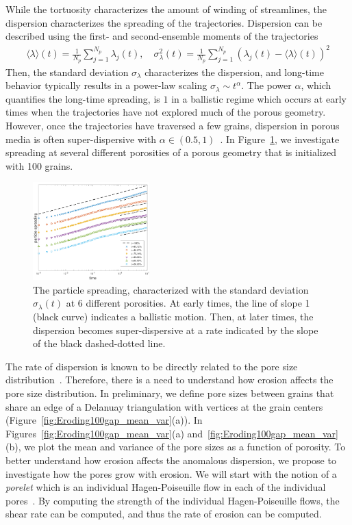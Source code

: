 \documentclass[11pt]{article}
\begin{document}
While the tortuosity characterizes the amount of winding of streamlines, the dispersion characterizes the spreading of the trajectories.  Dispersion can be described using the first- and second-ensemble moments of the trajectories
\begin{align}
  \langle \lambda \rangle (t) = \frac{1}{N_p} \sum_{j=1}^{N_p}
    \lambda_j(t), \quad \sigma_\lambda^{2}(t) = \frac{1}{N_p}
    \sum_{j=1}^{N_p} (\lambda_j(t) - \langle \lambda \rangle(t))^2
\end{align}
Then, the standard deviation $\sigma_\lambda$ characterizes the
dispersion, and long-time behavior typically results in a power-law
scaling $\sigma_\lambda \sim t^{\alpha}$. The power $\alpha$, which
quantifies the long-time spreading, is $1$ in a ballistic regime which
occurs at early times when the trajectories have not explored much of
the porous geometry. However, once the trajectories have traversed a few
grains, dispersion in porous media is often super-dispersive with
$\alpha \in (0.5,1)$~\cite{}. In Figure~\ref{fig:100dispersion}, we
investigate spreading at several different porosities of a porous
geometry that is initialized with 100 grains.
\begin{figure}
  \includegraphics[width=0.4\textwidth]{figs/100b_second_moment_long_ref}
  \caption{\label{fig:100dispersion} The particle spreading,
  characterized with the standard deviation $\sigma_\lambda(t)$ at 6
  different porosities. At early times, the line of slope 1 (black
  curve) indicates a ballistic motion. Then, at later times, the
  dispersion becomes super-dispersive at a rate indicated by the slope
  of the black dashed-dotted line.}
\end{figure}

The rate of dispersion is known to be directly related to the pore size distribution~\cite{dea-qua-bir-jua2018}. Therefore, there is a need to understand how erosion affects the pore size distribution. In preliminary, we define pore sizes between grains that share an edge of a Delanuay triangulation with vertices at the grain centers (Figure~\ref{fig:Eroding100gap_mean_var}(a)). In Figures~\ref{fig:Eroding100gap_mean_var}(a) and~\ref{fig:Eroding100gap_mean_var}(b), we plot the mean and variance of the pore sizes as a function of porosity. To better understand how erosion affects the anomalous dispersion, we propose to investigate how the pores grow with erosion. We will start with the notion of a {\em porelet} which is an individual Hagen-Poiseuille flow in each of the individual pores~\cite{dea-qua-bib-jua2018}. By computing the strength of the individual Hagen-Poiseuille flows, the shear rate can be computed, and thus the rate of erosion can be computed. 
\end{document}
